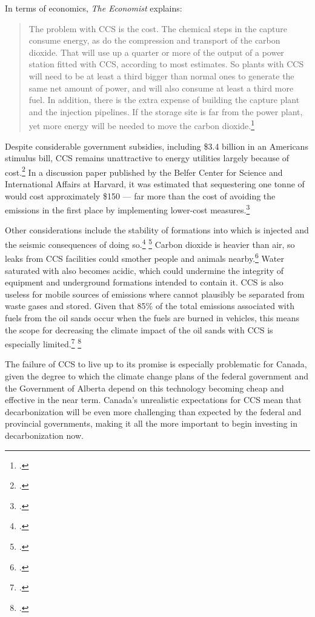 In terms of economics, \emph{The Economist} explains:
\begin{quote}
The problem with CCS is the cost. The chemical steps in the capture consume energy, as do the compression and transport of the carbon dioxide. That will use up a quarter or more of the output of a power station fitted with CCS, according to most estimates. So plants with CCS will need to be at least a third bigger than normal ones to generate the same net amount of power, and will also consume at least a third more fuel. In addition, there is the extra expense of building the capture plant and the injection pipelines. If the storage site is far from the power plant, yet more energy will be needed to move the carbon dioxide.\footcite[][]{TroubleInStore}
\end{quote}
Despite considerable government subsidies, including \$3.4 billion in an Americans stimulus bill, CCS remains unattractive to energy utilities largely because of cost.\footcite[][]{IllusionCleanCoal}
In a discussion paper published by the Belfer Center for Science and International Affairs at Harvard, it was estimated that sequestering one tonne of  would cost approximately \$150 --- far more than the cost of avoiding the emissions in the first place by implementing lower-cost measures.\footcite[][]{RealisticCostsCarbonCapture}



Other considerations include the stability of formations into which  is injected and the seismic consequences of doing so.\footcite[][]{CCSEarthquake} \footcite[See also: ][]{AFPonCCS}
Carbon dioxide is heavier than air, so leaks from CCS facilities could smother people and animals nearby.\footcite[][]{TroubleInStore}
Water saturated with  also becomes acidic, which could undermine the integrity of equipment and underground formations intended to contain it.
CCS is also useless for mobile sources of emissions where  cannot plausibly be separated from waste gases and stored.
Given that 85\% of the total emissions associated with fuels from the oil sands occur when the fuels are burned in vehicles, this means the scope for decreasing the climate impact of the oil sands with CCS is especially limited.\footcite[][]{HardToScrub} \footcite[][]{NoSilverBullet}



The failure of CCS to live up to its promise is especially problematic for Canada, given the degree to which the climate change plans of the federal government and the Government of Alberta depend on this technology becoming cheap and effective in the near term.
Canada's unrealistic expectations for CCS mean that decarbonization will be even more challenging than expected by the federal and provincial governments, making it all the more important to begin investing in decarbonization now.



